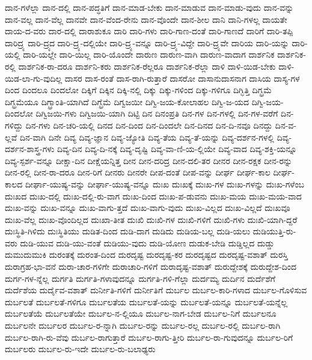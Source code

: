 {ದಾನ-ಗಳೆಲ್ಲಾ
ದಾನ-ದಲ್ಲಿ
ದಾನ-ಪದ್ಧತಿಗೆ
ದಾನ-ಮಾಡ-ಬೇಕು
ದಾನ-ಮಾಡುವ
ದಾನ-ಮಾಡು-ವುದು
ದಾನ-ವನ್ನು
ದಾನ-ವಲ್ಲ
ದಾನ-ವೆಲ್ಲ
ದಾನವೇ
ದಾನ-ವೆಂದ-ರೇನು
ದಾನ-ವೊಂದೇ
ದಾನ-ಶೀಲ
ದಾನಿ
ದಾನಿ-ಗಳಲ್ಲ
ದಾಯತೇ
ದಾಯ-ದ-ವರು
ದಾರ-ದಲ್ಲಿ
ದಾರಾಶುಕೂ
ದಾರಿ
ದಾರಿ-ಗಳು
ದಾರಿ-ಗಾಣ-ದಂತೆ
ದಾರಿ-ಗಾಣದೆ
ದಾರಿಗೆ
ದಾರಿ-ತಪ್ಪಿ
ದಾರಿದ್ರ್ಯ
ದಾರಿ-ದ್ರ್ಯದ
ದಾರಿ-ದ್ರ್ಯ-ದಲ್ಲಿಯೇ
ದಾರಿ-ದ್ರ್ಯ-ವನ್ನೂ
ದಾರಿ-ದ್ರ್ಯ-ವಿದ್ದೇ
ದಾರಿ-ದ್ರ್ಯವೇ
ದಾರಿಯ
ದಾರಿ-ಯನ್ನು
ದಾರಿ-ಯಲ್ಲಿ
ದಾರಿ-ಯಲ್ಲೇ
ದಾರಿ-ಯಿಲ್ಲ
ದಾರಿ-ಯೊಂದೇ
ದಾರುಣ
ದಾರುಣ-ವಾಗಿ
ದಾರುಣ-ವಾದಾಗ
ದಾರ್ಶನಿಕ
ದಾರ್ಶನಿಕ-ರಲ್ಲಿ
ದಾರ್ಶನಿಕ-ರಾ-ದರೂ
ದಾರ್ಶನಿ-ಕರು
ದಾರ್ಶನಿಕ-ರೆಲ್ಲರೂ
ದಾರ್ಶನಿಕ-ರೆಲ್ಲಾ
ದಾಳಿ
ದಾಳಿ-ಯಿಡ-ಬೇಕು
ದಾಳಿ-ಯಿಡ-ಲಾ-ಗು-ವುದಿಲ್ಲ
ದಾಸರ
ದಾಸ-ರಂತೆ
ದಾಸ-ರಾಗಿ-ರುತ್ತಾರೆ
ದಾಸರೋ
ದಾಸಾನುದಾಸನಾಗ
ದಾಸಿಯ
ದಾಸ್ಯ-ಗಳ
ದಿಂದ
ದಿಂದಲೂ
ದಿಂದಲೋ
ದಿಕ್ಕಿಗೆ
ದಿಕ್ಕಿನ
ದಿಕ್ಕಿ-ನಲ್ಲಿ
ದಿಕ್ಕು
ದಿಕ್ಕು-ಗಳಿಂದ
ದಿಕ್ಕು-ಗಳಿಗೂ
ದಿಗ್ಭಿತ್ತಿ
ದಿಗ್ಭ್ರಮೆ
ದಿಗ್ಭ್ರಮೆಯೂ
ದಿಗ್ಭ್ರಾಂತಿ-ಯಾಗಿದೆ
ದಿಗ್ಭ್ರೆಮೆ
ದಿಗ್ವಜಯೀ
ದಿಗ್ವಿ-ಜಯ-ಕೋಲಾಹಲ
ದಿಗ್ವಿ-ಜ-ಯದ
ದಿಗ್ವಿ-ಜಯ-ದಿಂದಲೋ
ದಿಗ್ವಿಜಯಿ-ಗಳು
ದಿಗ್ವಿಜಯಿ-ಯಾಗಿ
ದಿಟ್ಟಿ
ದಿನ
ದಿನಂಪ್ರತಿ
ದಿನ-ಗಳ
ದಿನ-ಗಳಲ್ಲಿ
ದಿನ-ಗಳ-ವರೆಗೆ
ದಿನ-ಗಳಿದ್ದು
ದಿನ-ಗಳು
ದಿನ-ಚರಿ-ಯಲ್ಲಿ
ದಿನದ
ದಿನ-ದಿಂದ
ದಿನ-ದಿಂದಲೇ
ದಿನ-ದಿನದ
ದಿನ-ದಿ-ನವೂ
ದಿನದ್ದು
ದಿನ-ವ-ಲ್ಲವೆ
ದಿನ-ವಾಗಿ
ದಿನೇ
ದಿವ್ಯ
ದಿವ್ಯ-ಜ್ಞಾನ
ದಿವ್ಯ-ಜ್ಯೋತಿ
ದಿವ್ಯ-ತೆಯ
ದಿವ್ಯ-ತೆ-ಯನ್ನು
ದಿವ್ಯ-ದರ್ಶನ-ಗಳಲ್ಲಿ
ದಿವ್ಯ-ದರ್ಶನ-ಶಾಸ್ತ್ರ-ಗಳು
ದಿವ್ಯ-ದಿನ
ದಿವ್ಯ-ದಿ-ನಕ್ಕೆ
ದಿವ್ಯ-ದೃಷ್ಟಿ
ದಿವ್ಯ-ವಾ-ಣಿ-ಯ-ಲ್ಲಿಯೇ
ದಿವ್ಯ-ವಾದ
ದಿವ್ಯ-ಶಕ್ತಿ-ಯನ್ನೂ
ದಿವ್ಯ-ಸ್ಪರ್ಶ-ವನ್ನೂ
ದೀಕ್ಷಾ-ದಿನ
ದೀಕ್ಷೆಯನ್ನಿತ್ತ
ದೀನ
ದೀನ-ದರಿದ್ರ
ದೀನ-ದಲಿ-ತರ
ದೀನರ
ದೀನ-ರಕ್ಷಕ
ದೀನ-ರನ್ನು
ದೀನ-ರಲ್ಲಿ
ದೀನ-ರಾ-ದರೂ
ದೀನ-ರಿಗೆ
ದೀನರು
ದೀನರೇ
ದೀಪ-ದಂತೆ
ದೀಪ-ವನ್ನು
ದೀರ್ಘ
ದೀರ್ಘ-ಕಾಲ
ದೀರ್ಘ-ಕಾಲದ
ದೀರ್ಘಾ-ಯುಷ್ಯ-ವನ್ನು
ದೀರ್ಘಾ-ಯುಷ್ಯ-ವನ್ನೂ
ದುಃಖ
ದುಃಖಕ್ಕೆ
ದುಃಖ-ಗಳ
ದುಃಖ-ಗಳನ್ನು
ದುಃಖ-ಗಳೆಂಬ
ದುಃಖದ
ದುಃಖ-ದಲ್ಲಿ
ದುಃಖ-ದಲ್ಲಿ-ರು-ವಾಗ
ದುಃಖ-ದಿಂದ
ದುಃಖ-ಪ-ಡುವನು
ದುಃಖ-ಮಯ
ದುಃಖ-ಮಯ-ವಾದ
ದುಃಖ-ವನ್ನು
ದುಃಖ-ವನ್ನೂ
ದುಃಖ-ವಾಗು-ತ್ತದೆ
ದುಃಖ-ವಾಗು-ವುದು
ದುಃಖ-ವಿಲ್ಲದ
ದುಃಖ-ವಿಲ್ಲದೆ
ದುಃಖವೂ
ದುಃಖ-ವೆಲ್ಲ
ದುಃಖ-ವೊಂದಿಲ್ಲದ
ದುಃಖಾ-ತೀತ
ದುಃಖಿ
ದುಃಖಿ-ಗಳ
ದುಃಖಿ-ಗಳಿಗೆ
ದುಃಖಿ-ಗಳು
ದುಃಖಿ-ಯಾಗಿ-ದ್ದರೆ
ದುಃಸ್ಥಿತಿ-ಗಿಳಿದು
ದುಃಸ್ಥಿತಿಯು
ದುಡಿತ-ದಿಂದ
ದುಡಿ-ದಾಗ
ದುಡಿದು
ದುಡಿಯ-ಬಲ್ಲ
ದುಡಿ-ಯಲು
ದುಡಿಯುತ್ತಿ-ರು-ವರು
ದುಡಿ-ಯುವ
ದುಡಿ-ಯು-ವಂತೆ
ದುಡಿಯು-ವುದು
ದುಡಿ-ಯೋಣ
ದುಡುಕ-ಬೇಡಿ
ದುಡ್ಡಿಲ್ಲದ
ದುಡ್ಡು
ದುಮುದುಮುಕಿ
ದುರಂತಕ್ಕೆ
ದುರಂತ-ದಿಂದ
ದುರದೃಷ್ಟ
ದುರದೃಷ್ಟ-ಕರ
ದುರದೃಷ್ಟದ
ದುರದೃಷ್ಟ-ವಶಾತ್
ದುರಸ್ತಿ
ದುರಾಗ್ರಹ-ಭಾ-ವನೆ
ದುರಾ-ಚಾರ-ಗಳಿಗೇ
ದುರಾಚಾರಿ-ಗಳಿಗೆ
ದುರಾದೃಷ್ಟ-ವಶಾತ್
ದುರುದ್ದೇಶಕ್ಕೆ
ದುರುದ್ದೇಶ-ದಿಂದ
ದುರ್ಗ-ಗಳ-ನ್ನೆಲ್ಲ
ದುರ್ಗತಿ
ದುರ್ಗತಿ-ಗಳಾವುದನ್ನೂ
ದುರ್ಗತಿ-ಗಳಿ-ಗೆಲ್ಲಾ
ದುರ್ದಮ್ಯ
ದುರ್ದಿನ
ದುರ್ದೆಶೆಗೆ
ದುರ್ದೆಶೆಯ
ದುರ್ದೈವ-ವಶಾತ್
ದುರ್ನೀತಿ-ಗಳಿಗೆ
ದುರ್ನೀತಿಗೆ
ದುರ್ಬಲ
ದುರ್ಬಲ-ಕಾರಿ-ಗಳಾದ
ದುರ್ಬಲ-ಗೊಳಿಸುವ
ದುರ್ಬಲತೆ
ದುರ್ಬಲತೆ-ಗಳಿಗೂ
ದುರ್ಬಲತೆಯ
ದುರ್ಬಲತೆ-ಯನ್ನು
ದುರ್ಬಲತೆ-ಯನ್ನೂ
ದುರ್ಬಲತೆ-ಯನ್ನೆಲ್ಲ
ದುರ್ಬಲತೆಯೆ
ದುರ್ಬಲತೆಯೇ
ದುರ್ಬಲ-ನ-ಲ್ಲಿಯೂ
ದುರ್ಬಲ-ನಾಗ-ಬೇಡ
ದುರ್ಬಲ-ನಿಗೆ
ದುರ್ಬಲನೂ
ದುರ್ಬಲನೇ
ದುರ್ಬಲರ
ದುರ್ಬಲ-ರ-ನ್ನಾಗಿ
ದುರ್ಬಲ-ರನ್ನು
ದುರ್ಬಲ-ರಲ್ಲ
ದುರ್ಬಲ-ರಲ್ಲಿ
ದುರ್ಬಲ-ರಾಗಿ
ದುರ್ಬಲ-ರಾಗಿ-ರು-ವೆವು
ದುರ್ಬಲ-ರಾಗುತ್ತಾರೆ
ದುರ್ಬಲ-ರಾಗು-ತ್ತೀರಿ
ದುರ್ಬಲ-ರಾ-ಗುವುದನ್ನೂ
ದುರ್ಬಲ-ರಿಗೆ
ದುರ್ಬಲರು
ದುರ್ಬಲ-ರು-ಇದೇ
ದುರ್ಬಲ-ರು-ಬಲಾಢ್ಯರು
}

